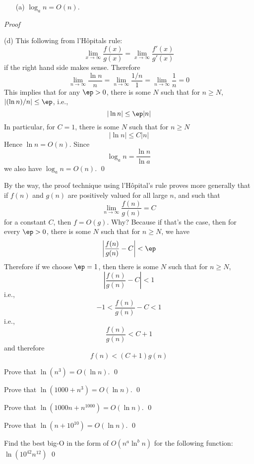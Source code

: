 \begin{thm} \mbox{}
 \begin{enumerate}
  \item[(a)] $\log_a n = O(n)$.
 \end{enumerate}
\end{thm}

\textit{Proof}


(d) This following from l'H\^opitals rule:
\[
\lim_{x \rightarrow \infty} \frac{f(x)}{g(x)}
= 
\lim_{x \rightarrow \infty} \frac{f'(x)}{g'(x)}
\]
if the right hand side makes sense.
Therefore
\[
\lim_{n \rightarrow \infty} \frac{\ln n}{n}
= 
\lim_{n \rightarrow \infty} \frac{1/n}{1}
= 
\lim_{n \rightarrow \infty} \frac{1}{n}
= 0
\]
This implies that for any $\ep > 0$, there is some $N$ such that
for $n \geq N$,
$|(\ln n)/n| \leq \ep$, i.e.,
\[
|\ln n| \leq \ep |n|
\]
In particular, for $C = 1$, there is some $N$ such that
for $n \geq N$
\[
|\ln n| \leq C|n|
\]
Hence $\ln n = O(n)$.
Since 
\[
\log_a n = \frac{\ln n}{\ln a}
\]
we also have
$\log_a n = O(n)$.
\qed

By the way, the proof technique using l'H\^opital's rule
proves more generally that if 
$f(n)$ and $g(n)$ are positively valued for all large $n$,
and such that
\[
\lim_{n\rightarrow \infty} \frac{f(n)}{g(n)} = C
\]
for a constant $C$, then $f = O(g)$.
Why?
Because if that's the case, 
then for every $\ep > 0$, 
there is some $N$
such that for $n \geq N$, we have
\[
\left|
\frac{f(n)}{g(n)} - C
\right| < \ep
\]
Therefore if we choose $\ep = 1$, then
there is some $N$ such that
for $n \geq N$,
\[
\left|
\frac{f(n)}{g(n)} - C
\right| < 1
\]
i.e.,
\[
-1 <
\frac{f(n)}{g(n)} - C
 < 1
\]
i.e.,
\[
\frac{f(n)}{g(n)} < C + 1
\]
and therefore
\[
f(n) < (C + 1) g(n)
\]


\begin{ex}
Prove that $\ln (n^3) = O(\ln n)$. 
\qed
\end{ex}

\begin{ex}
Prove that $\ln (1000 + n^3) = O(\ln n)$. 
\qed
\end{ex}

\begin{ex}
Prove that $\ln (1000n + n^{1000}) = O(\ln n)$. 
\qed
\end{ex}

\begin{ex}
Prove that $\ln (n + 10^{10}) = O(\ln n)$. 
\qed
\end{ex}

\begin{ex} 
Find the best big-O in the form of $O(n^a\ln^b n)$ for the following function:
$\ln (10^{42} n^{12})$
\qed
\end{ex}

